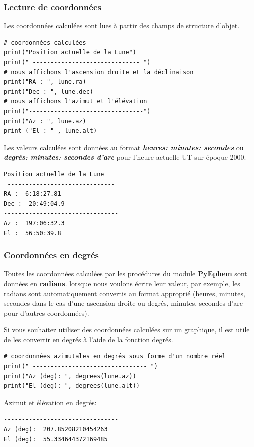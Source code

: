 \documentclass{beamer}
\begin{document}
\begin{frame}
\frametitle{Lecture de coordonnées}

Les coordonnées calculées sont lues à partir des champs de structure d'objet.
\begin{verbatim}
# coordonnées calculées
print("Position actuelle de la Lune")
print(" ------------------------------ ")
# nous affichons l'ascension droite et la déclinaison
print("RA : ", lune.ra)
print("Dec : ", lune.dec)
# nous affichons l'azimut et l'élévation
print("--------------------------------")
print("Az : ", lune.az)
print ("El : " , lune.alt)
\end{verbatim}
Les valeurs calculées sont données au format \emph{\textbf{heures: minutes: secondes}} ou \emph{\textbf{degrés: minutes: secondes d'arc}} pour l'heure actuelle UT sur époque 2000.
\begin{Verbatim}[numbers=none,fontsize=\fontsize{9pt}{9pt},baselinestretch=0.95]
Position actuelle de la Lune
 ------------------------------
RA :  6:18:27.81
Dec :  20:49:04.9
--------------------------------
Az :  197:06:32.3
El :  56:50:39.8
\end{Verbatim}
\end{frame}

\begin{frame}
\frametitle{Coordonnées en degrés}

Toutes les coordonnées calculées par les procédures du module \textbf{PyEphem} sont données en \textbf{radians}. lorsque nous voulons écrire leur valeur, par exemple, les radians sont automatiquement convertis au format approprié (heures, minutes, secondes dans le cas d'une ascension droite ou degrés, minutes, secondes d'arc pour d'autres coordonnées).

Si vous souhaitez utiliser des coordonnées calculées sur un graphique, il est utile de les convertir en degrés à l'aide de la fonction degrés.

\begin{verbatim}
# coordonnées azimutales en degrés sous forme d'un nombre réel
print(" -------------------------------- ")
print("Az (deg): ", degrees(lune.az))
print("El (deg): ", degrees(lune.alt))
\end{verbatim}
Azimut et élévation en degrés:
\begin{Verbatim}[numbers=none,fontsize=\fontsize{9pt}{9pt},baselinestretch=0.95]
--------------------------------
Az (deg):  207.85208210454263
El (deg):  55.334644372169485
\end{Verbatim}
\end{frame}
\end{document}
